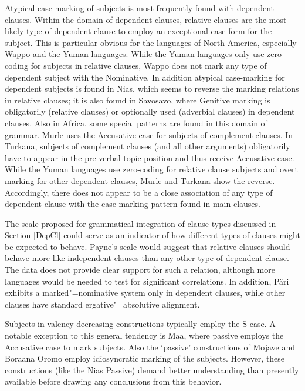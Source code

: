 Atypical case-marking of subjects is most frequently found with dependent clauses. 
Within the domain of dependent clauses, relative clauses are the most likely type of dependent clause to employ an exceptional case-form for the subject. 
This is particular obvious for the languages of North America, especially Wappo and the Yuman languages. 
While the Yuman languages only use zero-coding for subjects in relative clauses, Wappo does not mark any type of dependent subject with the Nominative. 
In addition atypical case-marking for dependent subjects is found in Nias, which seems to reverse the marking relations in relative clauses; it is also found in Savosavo, where Genitive marking is obligatorily (relative clauses) or optionally used (adverbial clauses) in dependent clauses. 
Also in Africa, some special patterns are found in this domain of grammar. 
Murle uses the Accusative case for  subjects of complement clauses. 
In Turkana, subjects of complement clauses (and all other arguments) obligatorily have to appear in the pre-verbal topic-position and thus receive Accusative case. 
While the Yuman languages use zero-coding for relative clause subjects and overt marking for other dependent clauses, Murle and Turkana show the reverse. 
Accordingly, there does not appear to be a close association of any type of dependent clause with the case-marking pattern found in main clauses. 

The scale proposed for grammatical integration of clause-types \citep{Payne:1997} discussed in Section \ref{DepCl} could serve as an indicator of how different types of clauses might be expected to behave.  
Payne's scale would suggest that relative clauses should behave more like independent clauses than any other type of dependent clause. 
The data does not provide clear support for such a relation, although more languages would be needed to test for significant correlations. 
In addition, P\"ari exhibits a marked"=nominative system only in dependent clauses, while other clauses have standard ergative"=absolutive alignment. 

Subjects in valency-decreasing %
constructions typically employ the S-case. 
A notable exception to this general tendency is Maa, where passive %
employs the Accusative case to mark subjects. 
Also the `passive' constructions of Mojave and Boraana Oromo employ idiosyncratic marking of the subjects. \enlargethispage{\baselineskip}
However, these constructions (like the Nias Passive) demand better understanding than presently available before drawing any conclusions from this behavior.

